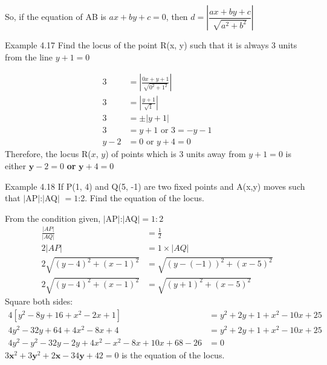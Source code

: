 So, if the equation of AB is $ax + by + c = 0$, then $d = \left|\dfrac{ax + by + c}{\sqrt{a^2 + b^2}}\right|$

\begin{example}{Example 4.17}
Find the locus of the point R(x, y) such that it is always 3 units from the line $y + 1 = 0$

\solution
\begin{align*}
3 &= \left|\frac{0x + y + 1}{\sqrt{0^2 + 1^2}}\right| \\
3 &= \left|\frac{y + 1}{\sqrt{1}}\right| \\
3 &= \pm|y + 1| \\
3 &= y + 1 \text{ or } 3 = -y - 1 \\
y - 2 &= 0 \text{ or } y + 4 = 0
\end{align*}
Therefore, the locus R($x$, $y$) of points which is 3 units away from $y + 1 = 0$ is
either $\boldsymbol{y} - 2 = 0$ \textbf{or} $\boldsymbol{y} + 4 = 0$
\end{example}

\begin{example}{Example 4.18}
If P(1, 4) and Q(5, -1) are two fixed points and A(x,y) moves such that $|$AP$|$:$|$AQ$|$
$= 1$:2. Find the equation of the locus.

\solution
From the condition given, $|$AP$|$:$|$AQ$| = 1 : 2$
\begin{align*}
\frac{|AP|}{|AQ|} &= \frac{1}{2} \\
2|AP| &= 1 \times |AQ| \\
2\sqrt{(y - 4)^2 + (x - 1)^2} &= \sqrt{(y - (-1))^2 + (x - 5)^2} \\
2\sqrt{(y - 4)^2 + (x - 1)^2} &= \sqrt{(y + 1)^2 + (x - 5)^2}
\end{align*}
Square both sides:
\begin{align*}
4\left[y^2 - 8y + 16 + x^2 - 2x + 1\right] &= y^2 + 2y + 1 + x^2 - 10x + 25 \\
4y^2 - 32y + 64 + 4x^2 - 8x + 4 &= y^2 + 2y + 1 + x^2 - 10x + 25 \\
4y^2 - y^2 - 32y - 2y + 4x^2 - x^2 - 8x + 10x + 68 - 26 &= 0
\end{align*}
$3\boldsymbol{x}^2 + 3\boldsymbol{y}^2 + 2\boldsymbol{x} - 34\boldsymbol{y} + 42 = 0$ is the equation of the locus.
\end{example}

